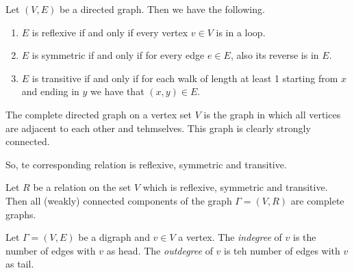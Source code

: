\begin{proposition}
    Let $ (V,E) $ be a directed graph. Then we have the following.
    \begin{enumerate}
        \item $E$ is reflexive if and only if every vertex $ v \in V $ is in a loop.
        \item $E$ is symmetric if and only if for every edge $ e \in E $, also its reverse is in $E$.
        \item $E$ is transitive if and only if for each walk of length at least 1 starting from $x$ and ending in $y$ we have that $ (x,y) \in E $.
    \end{enumerate}
\end{proposition}

\begin{example}
    The complete directed graph on a vertex set $V$ is the graph in which all vertices are adjacent to each other and tehmselves. This graph is clearly strongly connected. \par
    So, te corresponding relation is reflexive, symmetric and transitive.
\end{example}

\begin{proposition}
    Let $R$ be a relation on the set $V$ which is reflexive, symmetric and transitive. Then all (weakly) connected components of the graph $ \Gamma = (V,R)$ are complete graphs.
\end{proposition}

\begin{definition}
    Let $ \Gamma = (V,E) $ be a digraph and $ v \in V $ a vertex. The \emph{indegree} of $v$ is the number of edges with $v$ as head.
    The \emph{outdegree} of $v$ is teh number of edges with $v$ as tail.
\end{definition}

